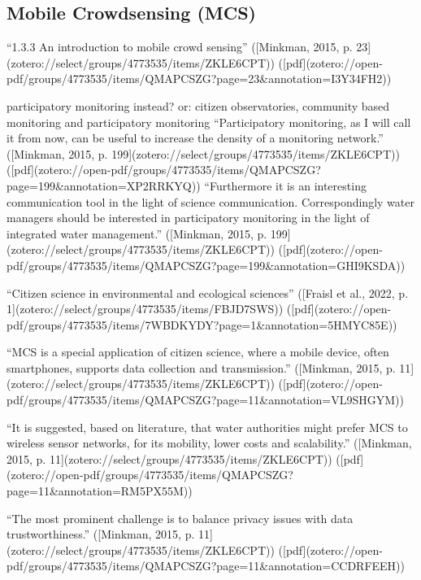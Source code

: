 {%

\subsection{Mobile Crowdsensing (MCS)}

“1.3.3 An introduction to mobile crowd sensing” ([Minkman, 2015, p. 23](zotero://select/groups/4773535/items/ZKLE6CPT)) ([pdf](zotero://open-pdf/groups/4773535/items/QMAPCSZG?page=23&annotation=I3Y34FH2))

participatory monitoring instead? or: citizen observatories, community based monitoring and participatory monitoring
“Participatory monitoring, as I will call it from now, can be useful to increase the density of a monitoring network.” ([Minkman, 2015, p. 199](zotero://select/groups/4773535/items/ZKLE6CPT)) ([pdf](zotero://open-pdf/groups/4773535/items/QMAPCSZG?page=199&annotation=XP2RRKYQ))
“Furthermore it is an interesting communication tool in the light of science communication. Correspondingly water managers should be interested in participatory monitoring in the light of integrated water management.” ([Minkman, 2015, p. 199](zotero://select/groups/4773535/items/ZKLE6CPT)) ([pdf](zotero://open-pdf/groups/4773535/items/QMAPCSZG?page=199&annotation=GHI9KSDA))


“Citizen science in environmental and ecological sciences” ([Fraisl et al., 2022, p. 1](zotero://select/groups/4773535/items/FBJD7SWS)) ([pdf](zotero://open-pdf/groups/4773535/items/7WBDKYDY?page=1&annotation=5HMYC85E))

“MCS is a special application of citizen science, where a mobile device, often smartphones, supports data collection and transmission.” ([Minkman, 2015, p. 11](zotero://select/groups/4773535/items/ZKLE6CPT)) ([pdf](zotero://open-pdf/groups/4773535/items/QMAPCSZG?page=11&annotation=VL9SHGYM))

“It is suggested, based on literature, that water authorities might prefer MCS to wireless sensor networks, for its mobility, lower costs and scalability.” ([Minkman, 2015, p. 11](zotero://select/groups/4773535/items/ZKLE6CPT)) ([pdf](zotero://open-pdf/groups/4773535/items/QMAPCSZG?page=11&annotation=RM5PX55M))

“The most prominent challenge is to balance privacy issues with data trustworthiness.” ([Minkman, 2015, p. 11](zotero://select/groups/4773535/items/ZKLE6CPT)) ([pdf](zotero://open-pdf/groups/4773535/items/QMAPCSZG?page=11&annotation=CCDRFEEH))

}
